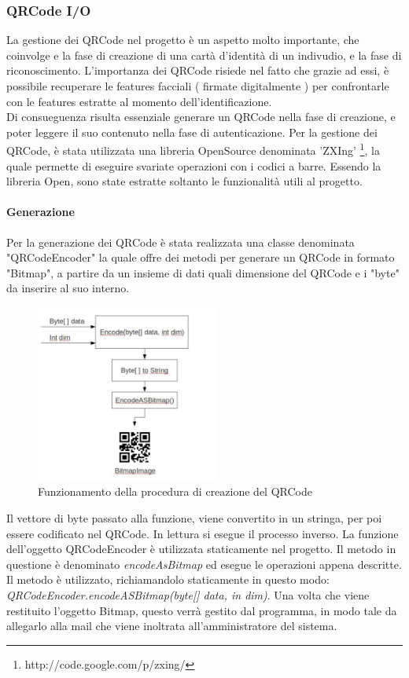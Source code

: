 \subsubsection{QRCode I/O}
La gestione dei QRCode nel progetto è un aspetto molto importante, che coinvolge
e la fase di creazione di una cartà d'identità di un indivudio, e la fase di riconoscimento.
L'importanza dei QRCode risiede nel fatto che grazie ad essi, è possibile recuperare le features facciali ( firmate digitalmente ) per confrontarle con le features estratte al momento dell'identificazione.\\
Di consueguenza risulta essenziale generare un QRCode nella fase di creazione, e poter leggere il suo contenuto nella fase di autenticazione.
Per la gestione dei QRCode, è stata utilizzata una libreria OpenSource denominata 'ZXIng' \footnote{http://code.google.com/p/zxing/}, la quale permette di eseguire svariate operazioni con i codici a barre. Essendo la libreria Open, sono state estratte soltanto le funzionalità utili al progetto.
\paragraph{Generazione}
Per la generazione dei QRCode è stata realizzata una classe denominata "QRCodeEncoder" la quale offre dei metodi per generare un QRCode in formato "Bitmap", a partire da un insieme di dati quali dimensione del QRCode e i "byte" da inserire al suo interno. 
\begin{figure}[htbp]
   \centering
   \includegraphics[width=6cm]{img/qrgen}
   \caption{Funzionamento della procedura di creazione del QRCode\label{qrgen}}
\end{figure}

Il vettore di byte passato alla funzione, viene convertito in un stringa, per poi essere codificato nel QRCode. In lettura si esegue il processo inverso.
La funzione dell'oggetto QRCodeEncoder è utilizzata staticamente nel progetto. Il metodo in questione è denominato \textit{encodeAsBitmap} ed esegue le operazioni appena descritte. Il metodo è utilizzato, richiamandolo staticamente in questo modo: \textit{QRCodeEncoder.encodeASBitmap(byte[] data, in dim)}.
Una volta che viene restituito l'oggetto Bitmap, questo verrà gestito dal programma, in modo tale da allegarlo alla mail che viene inoltrata all'amministratore del sistema.

